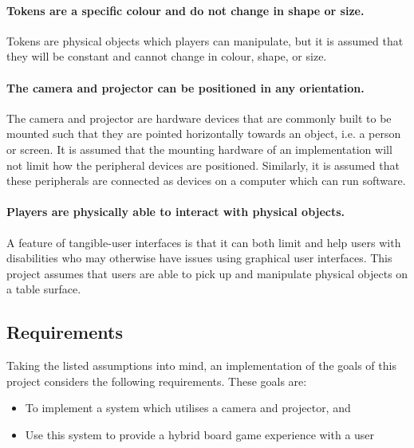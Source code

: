 \documentclass[12pt]{article}
\begin{document}
\paragraph{Tokens are a specific colour and do not change in shape or size.} Tokens are physical objects which players can manipulate, but it is assumed that they will be constant and cannot change in colour, shape, or size. 

\paragraph{The camera and projector can be positioned in any orientation.} The camera and projector are hardware devices that are commonly built to be mounted such that they are pointed horizontally towards an object, i.e. a person or screen. 
It is assumed that the mounting hardware of an implementation will not limit how the peripheral devices are positioned. 
Similarly, it is assumed that these peripherals are connected as devices on a computer which can run software.

\paragraph{Players are physically able to interact with physical objects.} A feature of tangible-user interfaces is that it can both limit and help users with disabilities who may otherwise have issues using graphical user interfaces. 
This project assumes that users are able to pick up and manipulate physical objects on a table surface. 

\subsection{Requirements}
Taking the listed assumptions into mind, an implementation of the goals of this project considers the following requirements. These goals are:
\begin{itemize}
    \item To implement a system which utilises a camera and projector, and
    \item Use this system to provide a hybrid board game experience with a user
\end{itemize}
\end{document}
